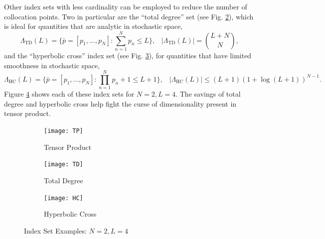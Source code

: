 \documentclass{mc2015}
\begin{document}
Other index sets with less cardinality can be employed to reduce the number of collocation points.  Two in particular are the ``total degree'' set (see Fig. \ref{TD}), which is ideal for quantities that are analytic in stochastic space,
\begin{equation}
\Lambda_\text{TD}(L)=\Big\{\bar p=[p_1,...,p_N]:\sum_{n=1}^N p_n \leq L \Big\},\hspace{10pt}|\Lambda_\text{TD}(L)|={L+N\choose N},
\end{equation}
and the ``hyperbolic cross'' index set (see Fig. \ref{HC}), for quantities that have limited smoothness in stochastic space,
\begin{equation}
\Lambda_\text{HC}(L)=\Big\{\bar p=[p_1,...,p_N]:\prod_{n=1}^N p_n+1 \leq L+1 \Big\},\hspace{10pt}|\Lambda_\text{HC}(L)|\leq (L+1)(1+\log(L+1))^{N-1}.
\end{equation}
Figure \ref{indexsets} shows each of these index sets for $N=2,L=4$.  The savings of total degree and hyperbolic cross help fight the curse of dimensionality present in tensor product. 
\begin{figure}[H]
\centering
  \begin{subfigure}[b]{0.32 \textwidth}
   \texttt{[image: TP]}
   \caption{Tensor Product}
   \label{TP}
  \end{subfigure}
  \begin{subfigure}[b]{0.32 \textwidth}
   \texttt{[image: TD]}
   \caption{Total Degree}
   \label{TD}
  \end{subfigure}
  \begin{subfigure}[b]{0.32 \textwidth}
   \texttt{[image: HC]}
   \caption{Hyperbolic Cross}
   \label{HC}
  \end{subfigure}
  \caption{Index Set Examples: $N=2,L=4$}
  \label{indexsets}
\end{figure}
\end{document}
